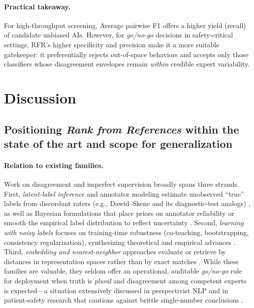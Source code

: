 \documentclass[12pt]{article}
\begin{document}
\paragraph{Practical takeaway.} For high-throughput screening, Average pairwise F1 offers a higher yield (recall) of candidate unbiased AIs. However, for \emph{go/no-go} decisions in safety-critical settings, RFR’s higher specificity and precision make it a more suitable gatekeeper: it preferentially rejects out-of-space behaviors and accepts only those classifiers whose disagreement envelopes remain \emph{within} credible expert variability.






\section{Discussion}

\subsection{Positioning \textit{Rank from References} within the state of the art and scope for generalization}

\paragraph{Relation to existing families.}
Work on disagreement and imperfect supervision broadly spans three strands. First, \emph{latent-label inference} and annotator modeling estimate unobserved “true” labels from discordant raters (e.g., Dawid–Skene and its diagnostic-test analogs) \cite{dawid1979maximum,hui1980study}, as well as Bayesian formulations that place priors on annotator reliability or smooth the empirical label distribution to reflect uncertainty \cite{chou2019,fornaciari2021}. Second, \emph{learning with noisy labels} focuses on training-time robustness (co-teaching, bootstrapping, consistency regularization), synthesizing theoretical and empirical advances \cite{garg2021,han2022,han2023,frenay2014,cannings2018}. Third, \emph{embedding and nearest-neighbor} approaches evaluate or retrieve by distances in representation spaces rather than by exact matches \cite{disalvo2024}. While these families are valuable, they seldom offer an operational, auditable \emph{go/no-go} rule for deployment when truth is \emph{plural} and disagreement among competent experts is expected—a situation extensively discussed in perspectivist NLP \cite{basile2021} and in patient-safety research that cautions against brittle single-number conclusions \cite{shojania2020}.
\end{document}
